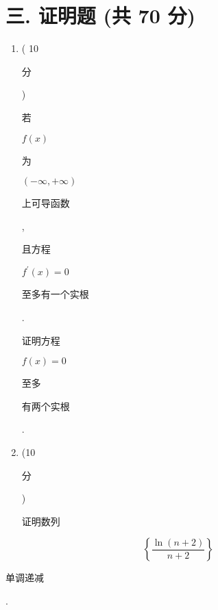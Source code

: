 \documentclass[10pt]{article}
\begin{document}
\section{三. 证明题 (共 70 分)}
\begin{enumerate}
  \item ( 10 \begin{CJK}{UTF8}{mj}分\end{CJK}) \begin{CJK}{UTF8}{mj}若\end{CJK} $f(x)$ \begin{CJK}{UTF8}{mj}为\end{CJK} $(-\infty,+\infty)$ \begin{CJK}{UTF8}{mj}上可导函数\end{CJK}, \begin{CJK}{UTF8}{mj}且方程\end{CJK} $f^{\prime}(x)=0$ \begin{CJK}{UTF8}{mj}至多有一个实根\end{CJK}. \begin{CJK}{UTF8}{mj}证明方程\end{CJK} $f(x)=0$ \begin{CJK}{UTF8}{mj}至多\end{CJK} \begin{CJK}{UTF8}{mj}有两个实根\end{CJK}.

  \item (10 \begin{CJK}{UTF8}{mj}分\end{CJK}) \begin{CJK}{UTF8}{mj}证明数列\end{CJK}

\end{enumerate}
$$
\left\{\frac{\ln (n+2)}{n+2}\right\}
$$
\begin{CJK}{UTF8}{mj}单调递减\end{CJK}.
\end{document}

